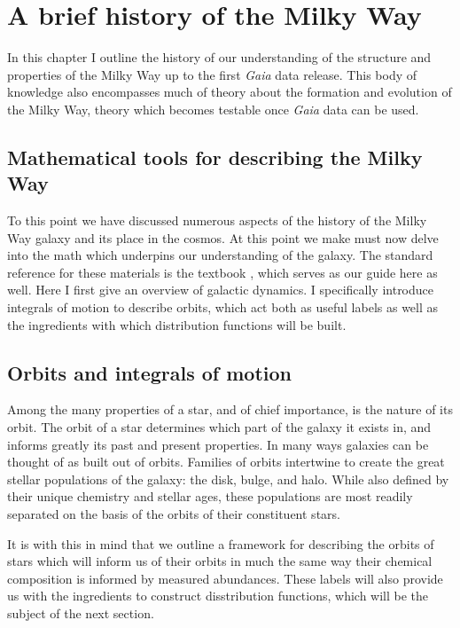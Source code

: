 
\section{A brief history of the Milky Way}

In this chapter I outline the history of our understanding of the structure and properties of the Milky Way up to the first \textit{Gaia} data release. This body of knowledge also encompasses much of theory about the formation and evolution of the Milky Way, theory which becomes testable once \textit{Gaia} data can be used.

\subsection{Mathematical tools for describing the Milky Way}

To this point we have discussed numerous aspects of the history of the Milky Way galaxy and its place in the cosmos. At this point we make must now delve into the math which underpins our understanding of the galaxy. The standard reference for these materials is the textbook \cite{binney08}, which serves as our guide here as well. Here I first give an overview of galactic dynamics. I specifically introduce integrals of motion to describe orbits, which act both as useful labels as well as the ingredients with which distribution functions will be built.

\subsection{Orbits and integrals of motion}

Among the many properties of a star, and of chief importance, is the nature of its orbit. The orbit of a star determines which part of the galaxy it exists in, and informs greatly its past and present properties. In many ways galaxies can be thought of as built out of orbits. Families of orbits intertwine to create the great stellar populations of the galaxy: the disk, bulge, and halo. While also defined by their unique chemistry and stellar ages, these populations are most readily separated on the basis of the orbits of their constituent stars.

It is with this in mind that we outline a framework for describing the orbits of stars which will inform us of their orbits in much the same way their chemical composition is informed by measured abundances. These labels will also provide us with the ingredients to construct disstribution functions, which will be the subject of the next section.


